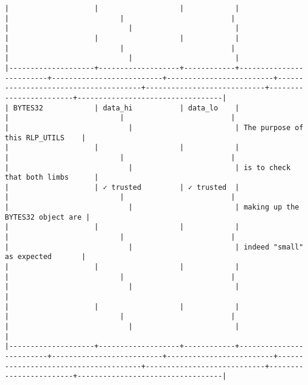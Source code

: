 \documentclass[varwidth=\maxdimen,margin=0.5cm,multi={verbatim}]{standalone}
\begin{document}
\begin{verbatim}
|                    |                   |            |                         |                          |                         |                                      |                            |                        |
|                    |                   |            |                         |                          |                         |                                      |                            |                        |
|--------------------+-------------------+------------+-------------------------+--------------------------+-------------------------+--------------------------------------+----------------------------+------------------------+----------------------------------|
| BYTES32            | data_hi           | data_lo    |                         |                          |                         |                                      |                            |                        | The purpose of this RLP_UTILS    |
|                    |                   |            |                         |                          |                         |                                      |                            |                        | is to check that both limbs      |
|                    | ✓ trusted         | ✓ trusted  |                         |                          |                         |                                      |                            |                        | making up the BYTES32 object are |
|                    |                   |            |                         |                          |                         |                                      |                            |                        | indeed "small" as expected       |
|                    |                   |            |                         |                          |                         |                                      |                            |                        |                                  |
|                    |                   |            |                         |                          |                         |                                      |                            |                        |                                  |
|--------------------+-------------------+------------+-------------------------+--------------------------+-------------------------+--------------------------------------+----------------------------+------------------------+----------------------------------|

\end{verbatim}
\end{document}

